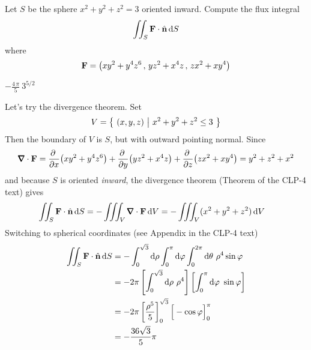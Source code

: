 \begin{question}[M317 2017D] %
Let $S$ be the sphere $x^2+y^2+z^2=3$ oriented inward. 
Compute the flux integral
\begin{equation*}
\iint_S\mathbf{F}\cdot\hat{\mathbf{n}}\,\mathrm{d}S
\end{equation*}
where
\begin{equation*}
\mathbf{F} = \big(xy^2 + y^4z^6\,,\, yz^2+x^4z\,,\,zx^2+xy^4\big)
\end{equation*}
\end{question}


\begin{answer} 
$-\frac{4\,\pi}{5}\ 3^{5/2}$
\end{answer}

\begin{solution} 
Let's try the divergence theorem. Set
\begin{equation*}
V = \big\{ \ (x,y,z)\ \big|\ x^2+y^2+z^2\le 3\ \big\}
\end{equation*}
Then the boundary of $V$ is $S$, but with outward pointing normal. 
Since
\begin{equation*}
\vnabla\cdot\vF = 
   \pdiff{}{x} \big(xy^2 + y^4z^6\big)
 + \pdiff{}{y} \big(yz^2+x^4z\big) 
 + \pdiff{}{z} \big(zx^2+xy^4\big)
=y^2+z^2+x^2
\end{equation*}
and because $S$ is oriented \emph{inward}, the divergence theorem 
(Theorem  of the CLP-4 text)
gives
\begin{align*}
\dblInt_S\vF\cdot\hn\,\dee{S}
         &=-\tripInt_V \vnabla\cdot\vF\,\dee{V}
          = -\tripInt_V (x^2+y^2+z^2)\,\dee{V}
\end{align*}
Switching to spherical coordinates (see Appendix 
in the CLP-4 text)
\begin{align*}
\iint_S\mathbf{F}\cdot\hat{\mathbf{n}}\,\mathrm{d}S
&=-\int_0^{\sqrt{3}}\mathrm{d}\rho\int_0^\pi\mathrm{d}\varphi
             \int_0^{2\pi}\mathrm{d}\theta \ \rho^4\sin\varphi \\
&=-2\pi\left[\int_0^{\sqrt{3}}\mathrm{d}\rho\ \rho^4\right]
      \left[\int_0^\pi\mathrm{d}\varphi\ \sin\varphi\right] \\
&=-2\pi\left[\frac{\rho^5}{5}\right]_0^{\sqrt{3}}
      \Big[-\cos\varphi\Big]_0^\pi \\
&=-\frac{36\sqrt{3}}{5}\pi
\end{align*}
\end{solution}

